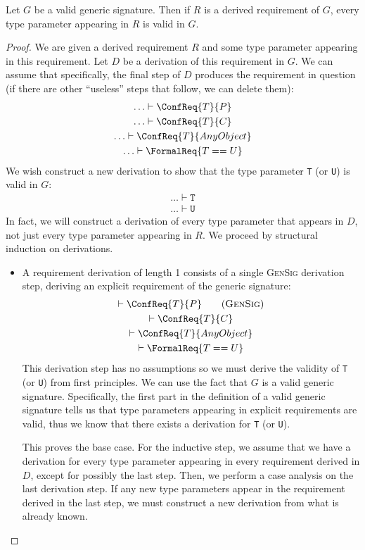 \documentclass[../generics]{subfiles}
\begin{document}
\begin{proposition}[Validity]\label{validity lemma}
Let $G$ be a valid generic signature. Then if $R$ is a derived requirement of $G$, every type parameter appearing in $R$ is valid in $G$.
\end{proposition}
\begin{proof}
We are given a derived requirement $R$ and some type parameter appearing in this requirement. Let $D$ be a derivation of this requirement in $G$. We can assume that specifically, the final step of $D$ produces the requirement in question (if there are other ``useless'' steps that follow, we can delete them):
\begin{gather*}
\ldots\vdash\ConfReq{T}{P}\\
\ldots\vdash\ConfReq{T}{C}\\
\ldots\vdash\ConfReq{T}{AnyObject}\\
\ldots\vdash\FormalReq{T == U}
\end{gather*}
We wish construct a new derivation to show that the type parameter \texttt{T} (or \texttt{U}) is valid in $G$:
\begin{gather*}
\ldots\vdash\texttt{T}\\
\ldots\vdash\texttt{U}
\end{gather*}
In fact, we will construct a derivation of every type parameter that appears in $D$, not just every type parameter appearing in $R$. We proceed by structural induction on derivations.
\begin{itemize}
\item
A requirement derivation of length 1 consists of a single \textsc{GenSig} derivation step, deriving an explicit requirement of the generic signature:
\begin{gather*}
\vdash\ConfReq{T}{P}\tag{\textsc{GenSig}}\\
\vdash\ConfReq{T}{C}\\
\vdash\ConfReq{T}{AnyObject}\\
\vdash\FormalReq{T == U}
\end{gather*}
This derivation step has no assumptions so we must derive the validity of \texttt{T} (or \texttt{U}) from first principles. We can use the fact that $G$ is a valid generic signature. Specifically, the first part in the definition of a valid generic signature tells us that type parameters appearing in explicit requirements are valid, thus we know that there exists a derivation for \texttt{T} (or \texttt{U}).

This proves the base case. For the inductive step, we assume that we have a derivation for every type parameter appearing in every requirement derived in $D$, except for possibly the last step. Then, we perform a case analysis on the last derivation step. If any new type parameters appear in the requirement derived in the last step, we must construct a new derivation from what is already known.


\end{itemize}
\end{proof}
\end{document}
